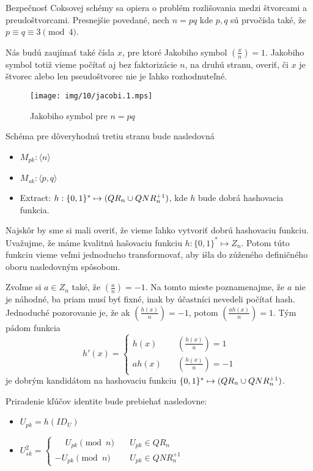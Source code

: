 Bezpečnosť Coksovej schémy \cite{cocks} sa opiera o problém rozlišovania medzi
štvorcami a preudoštvorcami. Presnejšie povedané,
nech $n=pq$ kde $p,q$ sú prvočísla také, že $p \equiv q \equiv 3 \pmod{4}$.

\def\jacobi#1#2{\left( \frac{#1}{#2} \right)}

Nás budú zaujímať také čísla $x$, pre ktoré Jakobiho symbol
$\jacobi{x}{n} =1$. Jakobiho symbol totiž vieme počítať aj bez
faktorizácie $n$, na druhú stranu, overiť, či $x$ je štvorec alebo len
pseudoštvorec nie je ľahko rozhodnuteľné.

\begin{figure}[h]
    \centering
    \texttt{[image: img/10/jacobi.1.mps]}
    \caption{Jakobiho symbol pre $n=pq$}
    \label{fig:jacobi}
\end{figure}


Schéma pre dôveryhodnú tretiu stranu bude nasledovná
\begin{itemize}
    \item $M_{pk}: \langle n \rangle$
    \item $M_{sk}: \langle p,q \rangle$
    \item Extract: $h: \{0,1\}^* \mapsto (QR_n \cup QNR_n^{+1})$,
    kde $h$ bude dobrá hashovacia funkcia.
\end{itemize}

Najskôr by sme si mali overiť, že vieme ľahko vytvoriť dobrú
hashovaciu funkciu. Uvažujme, že máme kvalitnú hašovaciu funkciu
$h:\{0,1\}^* \mapsto Z_n$.
Potom túto funkciu vieme veľmi jednoducho transformovať, aby išla do
zúženého definičného oboru nasledovným spôsobom.

Zvoľme si $a \in Z_n$ také, že $\jacobi{a}{n} = -1$. Na tomto mieste
poznamenajme, že $a$ nie je náhodné, ba priam musí byť fixné, inak by
účastníci nevedeli počítať hash.
Jednoduché pozorovanie je, že ak $\jacobi{h(x)}{n}=-1$,
potom $\jacobi{a h(x)}{n}=1$.
Tým pádom funkcia
\begin{equation*}
h'(x) = \begin{cases}
            h(x)   \quad &\jacobi{h(x)}{n}=1 \\
            a h(x) \quad &\jacobi{h(x)}{n}=-1
        \end{cases}
\end{equation*}
je dobrým kandidátom na hashovaciu funkciu
$\{0,1\}^* \mapsto (QR_n \cup QNR_n^{+1})$.

Priradenie kľúčov identite bude prebiehať nasledovne:
\begin{itemize}
    \item $U_{pk}=h(ID_U)$

    \item $U_{sk}^2=\begin{cases}
            \phantom{-} U_{pk}\pmod{n}  \quad& U_{pk} \in QR_n \\
                     -  U_{pk}\pmod{n}  \quad& U_{pk} \in QNR_n^{+1}
                    \end{cases}$
\end{itemize}

